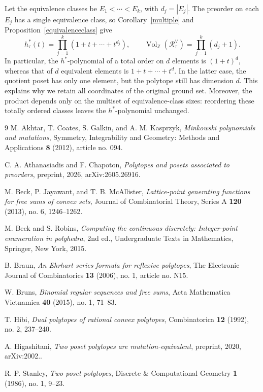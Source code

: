 \documentclass[11pt,reqno]{amsart}
\numberwithin{equation}{section}
\theoremstyle{definition}
\theoremstyle{remark}
\theoremstyle{definition}
\newcommand{\Rpoly}[1]{\mathcal R_{#1}^{\vee}}
\DeclareMathOperator{\Vol}{Vol}
\begin{document}
Let the equivalence classes be $E_1<\cdots<E_k$, with $d_j=|E_j|$. The preorder on each $E_j$ has a single equivalence class, so Corollary~\ref{multiple} and Proposition~\ref{equivalenceclass} give
\[
 h_\tau^*(t)=\prod_{j=1}^k(1+t+\cdots+t^{d_j}),\qquad
 \Vol_{\mathbb Z}(\Rpoly{\tau})=\prod_{j=1}^k(d_j+1).
\]
In particular, the $h^*$-polynomial of a total order on $d$ elements is $(1+t)^d$, whereas that of $d$ equivalent elements is $1+t+\cdots+t^d$. In the latter case, the quotient poset has only one element, but the polytope still has dimension $d$. This explains why we retain all coordinates of the original ground set. Moreover, the product depends only on the multiset of equivalence-class sizes: reordering these totally ordered classes leaves the $h^*$-polynomial unchanged.

\clearpage
\begin{thebibliography}{9}
M. Akhtar, T. Coates, S. Galkin, and A. M. Kasprzyk, \emph{Minkowski polynomials and mutations}, Symmetry, Integrability and Geometry: Methods and Applications \textbf{8} (2012), article no. 094.

C. A. Athanasiadis and F. Chapoton, \emph{Polytopes and posets associated to preorders}, preprint, 2026, arXiv:2605.26916.

M. Beck, P. Jayawant, and T. B. McAllister, \emph{Lattice-point generating functions for free sums of convex sets}, Journal of Combinatorial Theory, Series A \textbf{120} (2013), no. 6, 1246--1262.

M. Beck and S. Robins, \emph{Computing the continuous discretely: Integer-point enumeration in polyhedra}, 2nd ed., Undergraduate Texts in Mathematics, Springer, New York, 2015.

B. Braun, \emph{An Ehrhart series formula for reflexive polytopes}, The Electronic Journal of Combinatorics \textbf{13} (2006), no. 1, article no. N15.

W. Bruns, \emph{Binomial regular sequences and free sums}, Acta Mathematica Vietnamica \textbf{40} (2015), no. 1, 71--83.

T. Hibi, \emph{Dual polytopes of rational convex polytopes}, Combinatorica \textbf{12} (1992), no. 2, 237--240.

A. Higashitani, \emph{Two poset polytopes are mutation-equivalent}, preprint, 2020, arXiv:2002..

R. P. Stanley, \emph{Two poset polytopes}, Discrete \& Computational Geometry \textbf{1} (1986), no. 1, 9--23.
\end{thebibliography}
\end{document}
